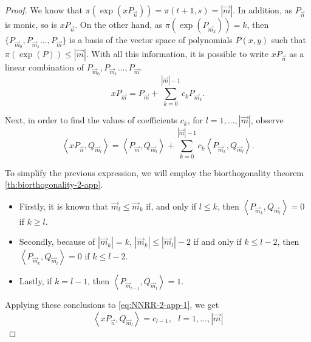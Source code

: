 \documentclass[12pt,a4]{report}
\theoremstyle{plain}
\newcommand{\prodesc}[2]{\left\langle #1 , #2 \right\rangle}
\begin{document}
    \begin{proof}
        We know that $\pi(\exp(xP_{\vec n}))=\pi(t+1,s)=|\vec m|$. In addition, as $P_{\vec n}$ is monic, so is $xP_{\vec n}$. On the other hand, as $\pi(\exp(P_{\vec m_k}))=k$, then $\{P_{\vec m_0}, P_{\vec m_1} \dots,P_{\vec m}\}$ is a basis of the vector space of polynomials $P(x,y)$ such that $\pi(\exp(P))\leq |\vec m|$. With all this information, it is possible to write $xP_{\vec n}$ as a linear combination of $P_{\vec m_0}, P_{\vec m_1} \dots,P_{\vec m}$.
        \begin{equation}
            xP_{\vec m} =  P_{\vec m} + \sum_{k=0}^{|\vec m|-1}c_k P_{\vec m_k}.
        \end{equation}

        Next, in order to find the values of coefficients $c_k$, for $l=1,\dots,|\vec m|$, observe
        \begin{equation}
            \label{eq:NNRR-2-app-1}
            \prodesc{xP_{\vec n}}{Q_{\vec m_l}} = \prodesc{P_{\vec m}}{Q_{\vec m_l}} + \sum_{k=0}^{|\vec m|-1} c_k \prodesc{P_{\vec m_k}}{Q_{\vec m_l}}.
        \end{equation}
    
        To simplify the previous expression, we will employ the biorthogonality theorem \ref{th:biorthogonality-2-app}. 
        \begin{itemize}
            \item Firstly, it is known that $\vec m_l \leq \vec m_k$ if, and only if $l\leq k$, then $\prodesc{P_{\vec m_k}}{Q_{\vec m_l}}=0$ if $k\geq l$.
            \item Secondly, because of $|\vec m_k|=k$,  $|\vec m_k| \leq |\vec m_l| - 2$ if and only if $k\leq l-2$, then $\prodesc{P_{\vec m_k}}{Q_{\vec m_l}}=0$ if $k\leq l-2$.
            \item Lastly, if $k=l-1$, then $\prodesc{P_{\vec m_{l-1}}}{Q_{\vec m_l}}=1$.
        \end{itemize}

        Applying these conclusions to \eqref{eq:NNRR-2-app-1}, we get
        \begin{equation}
            \prodesc{xP_{\vec n}}{Q_{\vec m_l}}=c_{l-1}, \ \ \ l=1,\dots,|\vec m|
        \end{equation}
        


\end{proof}
\end{document}
